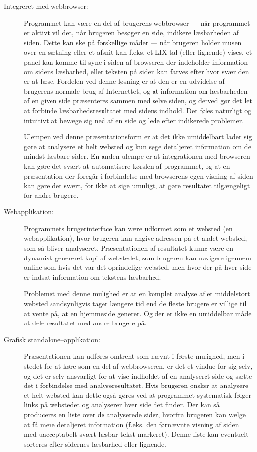 \documentclass[a4paper,oneside]{memoir}
\begin{document}
\begin{description}
\item[Integreret med webbrowser:]
  Programmet kan være en del af brugerens webbrowser --- når
  programmet er aktivt vil det, når brugeren besøger en side, indikere
  læsbarheden af siden. Dette kan ske på forskellige måder --- når
  brugeren holder musen over en sætning eller et afsnit kan f.eks. et
  LIX-tal (eller lignende) vises, et panel kan komme til syne i siden
  af browseren der indeholder information om sidens læsbarhed, eller
  teksten på siden kan farves efter hvor svær den er at læse. Fordelen
  ved denne løsning er at den er en udvidelse af brugerens normale
  brug af Internettet, og at information om læsbarheden af en given
  side præsenteres sammen med selve siden, og derved gør det let at
  forbinde læsbarhedsresultatet med sidens indhold. Det føles
  naturligt og intuitivt at bevæge sig ned af en side og lede efter
  indikerede problemer. 

  Ulempen ved denne præsentationsform er at det ikke umiddelbart lader
  sig gøre at analysere et helt websted og kun søge detaljeret
  information om de mindst læsbare sider. En anden ulempe er at
  integrationen med browseren kan gøre det svært at automatisere
  kørslen af programmet, og at en præsentation der foregår i
  forbindelse med browserens egen visning af siden kan gøre det svært,
  for ikke at sige umuligt, at gøre resultatet tilgængeligt for andre
  brugere.

\item[Webapplikation:]
  Programmets brugerinterface kan være udformet som et websted (en
  webapplikation), hvor brugeren kan angive adressen på et andet
  websted, som så bliver analyseret. Præsentationen af resultatet
  kunne være en dynamisk genereret kopi af webstedet, som brugeren kan
  navigere igennem online som hvis det var det oprindelige websted,
  men hvor der på hver side er indsat information om tekstens
  læsbarhed. 

  Problemet med denne mulighed er at en komplet analyse af et
  middelstort websted sandsynligvis tager længere tid end de fleste
  brugere er villige til at vente på, at en hjemmeside generer. Og der er ikke
  en umiddelbar måde at dele resultatet med andre brugere på.

\item[Grafisk standalone--applikation:] 
  Præsentationen kan udføres omtrent som nævnt i første mulighed, men
  i stedet for at køre som en del af webbrowseren, er det et vindue
  for sig selv, og det er selv ansvarligt for at vise indholdet af en
  analyseret side og sætte det i forbindelse med
  analyseresultatet. Hvis brugeren ønsker at analysere et helt websted
  kan dette også gøres ved at programmet systematisk følger links på
  webstedet og analyserer hver side det finder. Der kan så produceres
  en liste over de analyserede sider, hvorfra brugeren kan vælge at få
  mere detaljeret information (f.eks. den førnævnte visning af siden
  med uacceptabelt svært læsbar tekst markeret). Denne liste kan
  eventuelt sorteres efter sidernes læsbarhed eller lignende.


\end{description}
\end{document}
